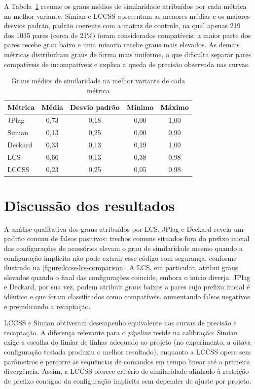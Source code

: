 A Tabela~\ref{table:average-similarity-degrees} resume os graus médios de similaridade atribuídos por cada métrica na melhor variante. Simian e LCCSS apresentam as menores médias e os maiores desvios padrão, padrão coerente com a matriz de controle, na qual apenas 219 dos 1035 pares (cerca de 21\%) foram considerados compatíveis: a maior parte dos pares recebe grau baixo e uma minoria recebe graus mais elevados. As demais métricas distribuíram graus de forma mais uniforme, o que dificulta separar pares compatíveis de incompatíveis e explica a queda de precisão observada nas curvas.

\begin{table}[htb]
	\centering
	\caption{Graus médios de similaridade na melhor variante de cada métrica}
	\label{table:average-similarity-degrees}
	\small
	\begin{tabular}{lcccc}
		\hline
		Métrica & Média & Desvio padrão & Mínimo & Máximo \\
		\hline
		JPlag & 0,73 & 0,18 & 0,00 & 1,00 \\
		Simian & 0,13 & 0,25 & 0,00 & 0,90 \\
		Deckard & 0,33 & 0,13 & 0,19 & 1,00 \\
		LCS & 0,66 & 0,13 & 0,38 & 0,98 \\
		LCCSS & 0,23 & 0,25 & 0,05 & 0,98 \\
		\hline
	\end{tabular}
\end{table}

\section{Discussão dos resultados}

A análise qualitativa dos graus atribuídos por LCS, JPlag e Deckard revela um padrão comum de falsos positivos: trechos comuns situados fora do prefixo inicial das configurações de acessórios elevam o grau de similaridade mesmo quando a configuração implícita não pode extrair esse código com segurança, conforme ilustrado na \autoref{figure:lccss-lcs-comparison}. A LCS, em particular, atribui graus elevados quando o final das configurações coincide, embora o início diverja. JPlag e Deckard, por sua vez, podem atribuir graus baixos a pares cujo prefixo inicial é idêntico e que foram classificados como compatíveis, aumentando falsos negativos e prejudicando a recaptação.

LCCSS e Simian obtiveram desempenho equivalente nas curvas de precisão e recaptação. A diferença relevante para o \textit{pipeline} reside na calibração: Simian exige a escolha do limiar de linhas adequado ao projeto (no experimento, a oitava configuração testada produziu o melhor resultado), enquanto a LCCSS opera sem parâmetros e percorre as sequências de comandos em tempo linear até a primeira divergência. Assim, a LCCSS oferece critério de similaridade alinhado à restrição de prefixo contíguo da configuração implícita sem depender de ajuste por projeto.

